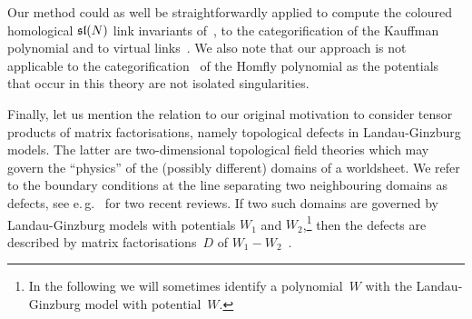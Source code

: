 \documentclass{compositio}
\theoremstyle{definition}
\numberwithin{equation}{section}
\begin{document}
Our method could as well be straightforwardly applied to compute the coloured homological $\mathfrak{sl}(N)$ link invariants of~\cite{w0907.0695}, to the categorification of the Kauffman polynomial and to virtual links~\cite{kr0701333}. We also note that our approach is not applicable to the categorification~\cite{kr0505056} of the Homfly polynomial as the potentials that occur in this theory are not isolated singularities. 

\medskip

Finally, let us mention the relation to our original motivation to consider tensor products of matrix factorisations, namely topological defects in Landau-Ginzburg models. The latter are two-dimensional topological field theories which may govern the ``physics'' of the (possibly different) domains of a worldsheet.  We refer to the boundary conditions at the line separating two neighbouring domains as defects, see e.\,g.~\cite{k1004.2307, dkr1107.0495} for two recent reviews. If two such domains are governed by Landau-Ginzburg models with potentials $W_{1}$ and $W_{2}$,\footnote{In the following we will sometimes identify a polynomial~$W$ with the Landau-Ginzburg model with potential~$W$.} then the defects are described by matrix factorisations~$D$ of $W_{1}-W_{2}$~\cite{br0707.0922}. 
\end{document}
